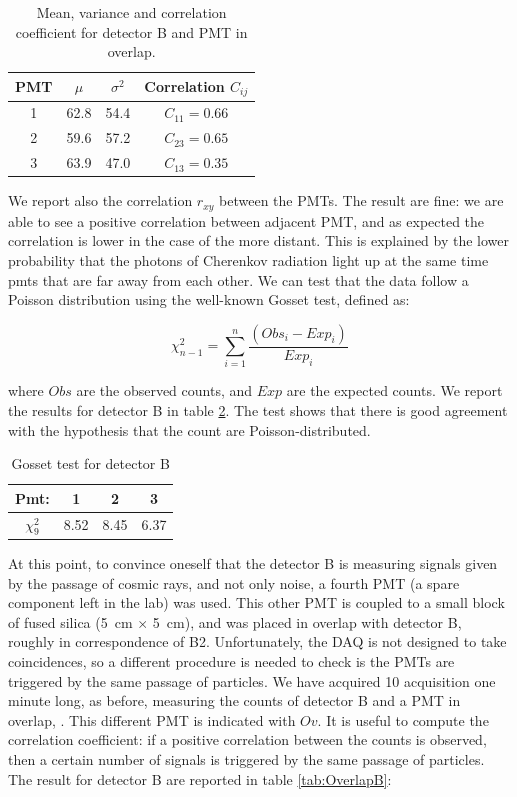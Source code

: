 \begin{table}[ht]
\centering
\begin{tabular}{c|c|c|c}
\hline 
PMT & $\mu$ & $\sigma^{2}$ & Correlation $C_{ij}$ \\
\hline
1 	& 62.8	& 54.4	& $C_{11} = 0.66$\\
2 	& 59.6	& 57.2	& $C_{23} = 0.65$\\
3	& 63.9	& 47.0  & $C_{13} = 0.35$\\
\hline
\end{tabular}
\caption{Mean, variance and correlation coefficient for detector B and PMT in overlap.}
\label{tab:Bcounts}
\end{table}

We report also the correlation $r_{xy}$ between the PMTs. The result are fine: we are able to see a positive correlation between adjacent PMT, and as expected the correlation is lower in the case of the more distant. This is explained by the lower probability that the photons of Cherenkov radiation light up at the same time pmts that are far away from each other.
We can test that the data follow a Poisson distribution using the well-known Gosset test, defined as:

\begin{equation}
\chi^{2}_{n-1} = \sum_{i = 1}^{n} \dfrac{(Obs_{i} - Exp_{i})}{Exp_{i}}
\end{equation}

where $Obs$ are the observed counts, and $Exp$ are the expected counts.
We report the results for detector B in table \ref{tab:GossetB}. The test shows that there is good agreement with the hypothesis that the count are Poisson-distributed.

\begingroup
\setlength{\tabcolsep}{8pt} %
\renewcommand{\arraystretch}{1.2} %
\begin{table}[htb]
\centering
\begin{tabular}{c|c|c|c}
\hline 
Pmt: & 1 & 2 & 3 \\ 
\hline
$\chi^{2}_{9}$ & 8.52 & 8.45 & 6.37 \\ 
\hline
\end{tabular}
\caption{Gosset test for detector B}
\label{tab:GossetB} 
\end{table}
\endgroup

At this point, to convince oneself that the detector B is measuring signals given by the passage of cosmic rays, and not only noise, a fourth PMT (a spare component left in the lab) was used. This other PMT is coupled to a small block of fused silica (\SI{5}{\centi \meter} $\times$ \SI{5}{\centi \meter}), and was placed in overlap with detector B, roughly in correspondence of B2.
Unfortunately, the DAQ is not designed to take coincidences, so a different procedure is needed to check is the PMTs are triggered by the same passage of particles. We have acquired 10 acquisition one minute long, as before, measuring the counts of detector B and a PMT in overlap, . This different PMT is indicated with $Ov$. 
It is useful to compute the correlation coefficient: if a positive correlation between the counts is observed, then a certain number of signals is triggered by the same passage of particles. The result for detector B are reported in table \ref{tab:OverlapB}:

